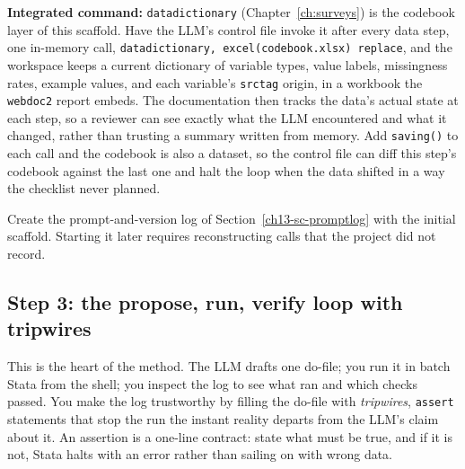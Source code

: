 \documentclass[
    a4paper,
    fontsize=10pt,
    twoside=true,
    numbers=noenddot,
]{kaobook}
\begin{document}
\begin{kaobox}[frametitle=Package Integration: \texttt{datadictionary} as the living codebook]
\textbf{Integrated command:} \texttt{datadictionary} (Chapter~\ref{ch:surveys}) is the codebook layer of this scaffold. Have the LLM's control file invoke it after every data step, one in-memory call, \texttt{datadictionary, excel(codebook.xlsx) replace}, and the workspace keeps a current dictionary of variable types, value labels, missingness rates, example values, and each variable's \texttt{srctag} origin, in a workbook the \texttt{webdoc2} report embeds. The documentation then tracks the data's actual state at each step, so a reviewer can see exactly what the LLM encountered and what it changed, rather than trusting a summary written from memory. Add \texttt{saving()} to each call and the codebook is also a dataset, so the control file can diff this step's codebook against the last one and halt the loop when the data shifted in a way the checklist never planned.
\end{kaobox}

Create the prompt-and-version log of Section~\ref{ch13-sc-promptlog} with the initial scaffold. Starting it later requires reconstructing calls that the project did not record.

\subsection{Step 3: the propose, run, verify loop with tripwires}
This is the heart of the method. The LLM drafts one do-file; you run it in batch Stata from the shell; you inspect the log to see what ran and which checks passed. You make the log trustworthy by filling the do-file with \emph{tripwires}, \texttt{assert} statements that stop the run the instant reality departs from the LLM's claim about it. An assertion is a one-line contract: state what must be true, and if it is not, Stata halts with an error rather than sailing on with wrong data.
\end{document}
